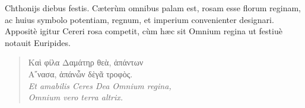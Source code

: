 \documentclass[a4paper, 11pt, oneside, polutonikogreek, latin]{article}
\begin{document}
Chthonijs diebus festis. Cæterùm omnibus palam est, rosam esse florum reginam, ac huius symbolo potentiam, regnum, et imperium convenienter designari. Appositè igitur Cereri rosa competit, cùm hæc sit Omnium regina ut festiuè notauit Euripides.
\begin{quote}
Καὶ φίλα Δαμάτηρ θεὰ, ἁπάντων\\
Α῎νασα, ἁπάνὧν δὲγᾶ τροφὸς.\\

\emph{Et amabilis Ceres Dea Omnium regina,}\\
\emph{Omnium vero terra altrix.}\\
\end{quote}
\paragraph{}
\end{document}
